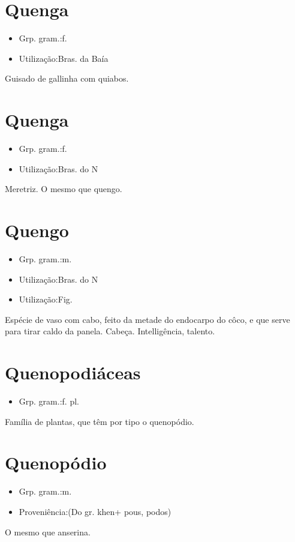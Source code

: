 \section{Quenga}
\begin{itemize}
\item {Grp. gram.:f.}
\end{itemize}
\begin{itemize}
\item {Utilização:Bras. da Baía}
\end{itemize}
Guisado de gallinha com quiabos.
\section{Quenga}
\begin{itemize}
\item {Grp. gram.:f.}
\end{itemize}
\begin{itemize}
\item {Utilização:Bras. do N}
\end{itemize}
Meretriz.
O mesmo que \textunderscore quengo\textunderscore .
\section{Quengo}
\begin{itemize}
\item {Grp. gram.:m.}
\end{itemize}
\begin{itemize}
\item {Utilização:Bras. do N}
\end{itemize}
\begin{itemize}
\item {Utilização:Fig.}
\end{itemize}
Espécie de vaso com cabo, feito da metade do endocarpo do côco, e que serve para tirar caldo da panela.
Cabeça.
Intelligência, talento.
\section{Quenopodiáceas}
\begin{itemize}
\item {Grp. gram.:f. pl.}
\end{itemize}
Família de plantas, que têm por tipo o \textunderscore quenopódio\textunderscore .
\section{Quenopódio}
\begin{itemize}
\item {Grp. gram.:m.}
\end{itemize}
\begin{itemize}
\item {Proveniência:(Do gr. \textunderscore khen\textunderscore  + \textunderscore pous\textunderscore , \textunderscore podos\textunderscore )}
\end{itemize}
O mesmo que \textunderscore anserina\textunderscore .
